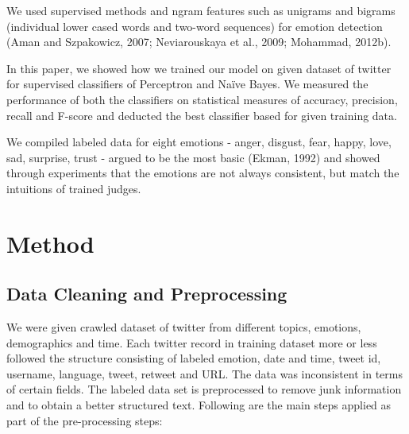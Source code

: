 \documentclass[11pt]{article}
\begin{document}
     We used supervised methods and ngram features such as unigrams and bigrams (individual lower cased words and two-word sequences) for emotion detection (Aman and Szpakowicz, 2007; Neviarouskaya et al., 2009; Mohammad, 2012b).

In this paper, we showed how we trained our model on given dataset of twitter for supervised classifiers of Perceptron and Naïve Bayes. We measured the performance of both the classifiers on statistical measures of accuracy, precision, recall and F-score and deducted the best classifier based for given training data.
 
We compiled labeled data for eight emotions - anger, disgust, fear, happy, love, sad, surprise, trust - argued to be the most basic (Ekman, 1992) and showed through experiments that the emotions are not always consistent, but match the intuitions of trained judges.



\section{Method}

\subsection{Data Cleaning and Preprocessing}

We were given crawled dataset of twitter from different topics, emotions, demographics and time. Each twitter record in training dataset more or less followed the structure consisting of labeled emotion, date and time, tweet id, username, language, tweet, retweet and URL. The data was inconsistent in terms of certain fields. The labeled data set is preprocessed to remove junk information and to obtain a better structured text. Following are the main steps applied as part of the pre-processing steps:
\end{document}
